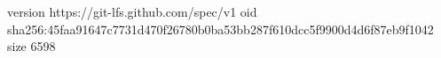 version https://git-lfs.github.com/spec/v1
oid sha256:45faa91647c7731d470f26780b0ba53bb287f610dcc5f9900d4d6f87eb9f1042
size 6598
